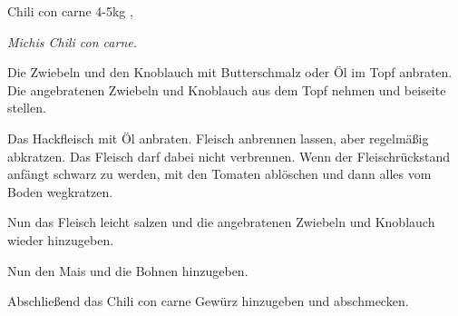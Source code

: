 \documentclass[../recipe-collections/cooking.tex]{subfiles}
\begin{document}
\begin{recipe}{Chili con carne} {4-5kg } {, }

  \freeform{}\textit{Michis Chili con carne.}


  Die Zwiebeln und den Knoblauch mit Butterschmalz oder Öl im Topf anbraten.
  Die angebratenen Zwiebeln und Knoblauch aus dem Topf nehmen und beiseite stellen.


  Das Hackfleisch mit Öl anbraten.
  Fleisch anbrennen lassen, aber regelmäßig abkratzen.
  Das Fleisch darf dabei nicht verbrennen.
  Wenn der Fleischrückstand anfängt schwarz zu werden, mit den Tomaten ablöschen und dann alles vom Boden wegkratzen.

  Nun das Fleisch leicht salzen und die angebratenen Zwiebeln und Knoblauch wieder hinzugeben.


  Nun den Mais und die Bohnen hinzugeben.


  Abschließend das Chili con carne Gewürz hinzugeben und abschmecken.

  \freeform{}\hrulefill{}

\end{recipe}
\end{document}
